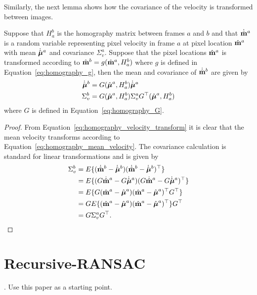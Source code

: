 Similarly, the next lemma shows how the covariance of the velocity is transformed between images.
\begin{lemma}
	Suppose that $H_a^b$ is the homography matrix between frames $a$ and $b$ and that $\dot{\hat{\mathbf{m}}}^a$ is a random variable representing pixel velocity in frame $a$ at pixel location $\hat{\mathbf{m}}^a$ with mean $\dot{\hat{\boldsymbol{\mu}}}^a$ and covariance $\Sigma_v^a$. Suppose that the pixel locations $\hat{\mathbf{m}}^a$ is transformed according to $\hat{\mathbf{m}}^b = g(\hat{\mathbf{m}}^a, H_a^b)$ where $g$ is defined in Equation~\eqref{eq:homography_g}, then the mean and covariance of $\dot{\hat{\mathbf{m}}}^b$ are given by
	\begin{align}
	\dot{\hat{\mubf}}^b &= G(\hat{\mubf}^a, H_a^b) \dot{\hat{\mubf}}^a 
	\label{eq:homography_mean_velocity} \\
	\Sigma_v^b &= G(\hat{\mubf}^a, H_a^b) \Sigma_v^a G^\top(\hat{\mubf}^a,H_a^b)
	\end{align}
	where $G$ is defined in Equation~\eqref{eq:homography_G}.
\end{lemma}
\begin{proof}
	From Equation~\eqref{eq:homography_velocity_transform} it is clear that the mean velocity transforms according to Equation~\eqref{eq:homography_mean_velocity}.
	The covariance calculation is standard for linear transformations and is given by
	\begin{align*}
	\Sigma_v^b &= E\{(\dot{\hat{\mathbf{m}}}^b-\dot{\hat{\boldsymbol{\mu}}}^b)(\dot{\hat{\mathbf{m}}}^b-\dot{\hat{\boldsymbol{\mu}}}^{b})^\top\} \\
	&= E\{(G\dot{\hat{\mathbf{m}}}^a-G\dot{\hat{\boldsymbol{\mu}}}^a)(G\dot{\hat{\mathbf{m}}}^a-G\dot{\hat{\boldsymbol{\mu}}}^{a})^\top\} \\
	&= E\{G(\hat{\mathbf{m}}^a - \hat{\boldsymbol{\mu}}^a)(\hat{\mathbf{m}}^a - \hat{\boldsymbol{\mu}}^a)^\top G^\top \} \\
	&= G E\{(\hat{\mathbf{m}}^a - \hat{\boldsymbol{\mu}}^a)(\hat{\mathbf{m}}^a - \hat{\boldsymbol{\mu}}^a)^\top\}G^\top \\
	&= G \Sigma_v^a G^\top.
	\end{align*}
\end{proof}





\section{Recursive-RANSAC}
\label{sec:RRANSAC} 

.  Use this paper as a starting point.

